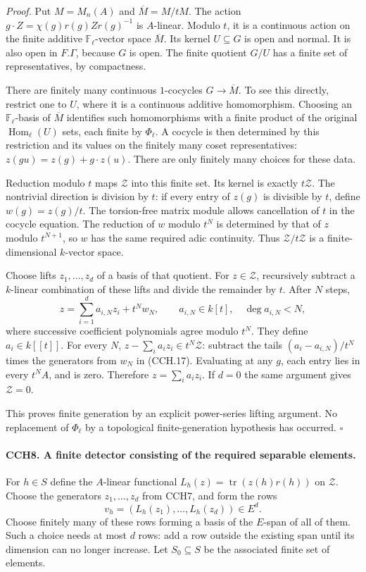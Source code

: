 \emph{Proof.}
Put $M=M_n(A)$ and $\overline M=M/tM$.
The action $g\cdot Z=\chi(g)r(g)Zr(g)^{-1}$ is $A$-linear.
Modulo $t$, it is a continuous action on the finite additive
$\mathbb F_\ell$-vector space $\overline M$.  Its kernel
$U\subseteq G$ is open and normal.  It is also open in
$F.\Gamma$, because $G$ is open.  The finite quotient $G/U$
has a finite set of representatives, by compactness.

There are finitely many continuous $1$-cocycles
$G\to\overline M$.  To see this directly, restrict one to
$U$, where it is a continuous additive homomorphism.
Choosing an $\mathbb F_\ell$-basis of $\overline M$ identifies
such homomorphisms with a finite product of the original
$\operatorname{Hom}_\ell(U)$ sets, each finite by
$\Phi_\ell$.  A cocycle is then determined by this restriction
and its values on the finitely many coset representatives:
$z(gu)=z(g)+g\cdot z(u)$.  There are only finitely many
choices for these data.

Reduction modulo $t$ maps $\mathcal Z$ into this finite set.
Its kernel is exactly $t\mathcal Z$.  The nontrivial direction
is division by $t$: if every entry of $z(g)$ is divisible by
$t$, define $w(g)=z(g)/t$.  The torsion-free matrix module
allows cancellation of $t$ in the cocycle equation.  The
reduction of $w$ modulo $t^N$ is determined by that of $z$
modulo $t^{N+1}$, so $w$ has the same required adic continuity.
Thus $\mathcal Z/t\mathcal Z$ is a finite-dimensional
$k$-vector space.

Choose lifts $z_1,\ldots,z_d$ of a basis of that quotient.
For $z\in\mathcal Z$, recursively subtract a $k$-linear
combination of these lifts and divide the remainder by $t$.
After $N$ steps,
\[
 z=\sum_{i=1}^d a_{i,N}z_i+t^Nw_N,
 \qquad a_{i,N}\in k[t],\quad \deg a_{i,N}<N,
 \tag{CCH.17}
\]
where successive coefficient polynomials agree modulo $t^N$.
They define $a_i\in k[[t]]$.
For every $N$, $z-\sum_i a_i z_i\in t^N\mathcal Z$:
subtract the tails $(a_i-a_{i,N})/t^N$ times the generators
from $w_N$ in (CCH.17).  Evaluating at any $g$, each entry
lies in every $t^NA$, and is zero.  Therefore
$z=\sum_i a_i z_i$.  If $d=0$ the same argument gives
$\mathcal Z=0$.

This proves finite generation by an explicit power-series
lifting argument.  No replacement of $\Phi_\ell$ by a
topological finite-generation hypothesis has occurred.
\hfill$\square$

\paragraph{CCH8. A finite detector consisting of the required separable elements.}
\label{claim:CCH8}
For $h\in S$ define the $A$-linear functional
$L_h(z)=\operatorname{tr}(z(h)r(h))$ on $\mathcal Z$.
Choose the generators $z_1,\ldots,z_d$ from CCH7, and form
the rows
\[
                       v_h=(L_h(z_1),\ldots,L_h(z_d))\in E^d.
\]
Choose finitely many of these rows forming a basis of the
$E$-span of all of them.  Such a choice needs at most $d$
rows: add a row outside the existing span until its dimension
can no longer increase.  Let $S_0\subseteq S$ be the associated
finite set of elements.

